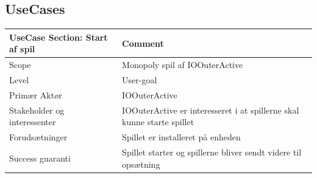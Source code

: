 \subsection{UseCases}
\begin{center}
    \begin{tabular}{ | m{10em} | m{10cm}| }
        \hline
            UseCase Section: Start af spil & Comment\\
        \hline
            Scope & Monopoly spil af IOOuterActive\\
        \hline
            Level & User-goal\\
        \hline
            Primær Aktør & IOOuterActive\\
        \hline
            Stakeholder og interessenter
            & IOOuterActive er interesseret i at spillerne skal kunne starte spillet\\
        \hline
            Forudsætninger & Spillet er installeret på enheden\\
        \hline
            Success guaranti & Spillet starter og spillerne bliver sendt videre til opsætning\\
        \hline
    \end{tabular}
\end{center}

